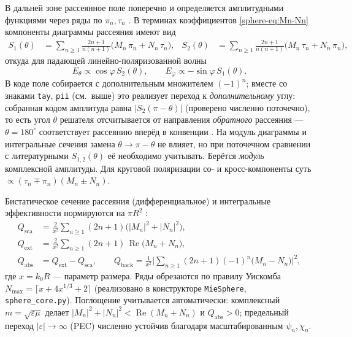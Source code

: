 \documentclass[11pt,a4paper]{article}
\begin{document}
В дальней зоне рассеянное поле поперечно и определяется амплитудными функциями через ряды по $\pi_n,\tau_n$ \cite{bohren1983}. В терминах коэффициентов \eqref{sphere-eq:Mn-Nn} компоненты диаграммы рассеяния имеют вид
\begin{align}
S_1(\theta)&=\sum_{n\ge1}\frac{2n+1}{n(n+1)}\big(M_n\,\pi_n+N_n\,\tau_n\big),
&
S_2(\theta)&=\sum_{n\ge1}\frac{2n+1}{n(n+1)}\big(M_n\,\tau_n+N_n\,\pi_n\big),
\label{sphere-eq:S12}
\end{align}
откуда для падающей линейно-поляризованной волны
\begin{equation}
E_\theta\propto \cos\varphi\,S_2(\theta),\qquad
E_\varphi\propto -\sin\varphi\,S_1(\theta).
\end{equation}
В коде поле собирается с дополнительным множителем $(-1)^n$; вместе со знаками \texttt{tay}, \texttt{pii} (см.\ выше) это реализует переход к \emph{дополнительному} углу: собранная кодом амплитуда равна $|S_2(\pi-\theta)|$ (проверено численно поточечно), то есть угол $\theta$ решателя отсчитывается от направления \emph{обратного} рассеяния --- $\theta=180^\circ$ соответствует рассеянию вперёд в конвенции \cite{bohren1983}. На модуль диаграммы и интегральные сечения замена $\theta\to\pi-\theta$ не влияет, но при поточечном сравнении с литературными $S_{1,2}(\theta)$ её необходимо учитывать. Берётся \emph{модуль} комплексной амплитуды. Для круговой поляризации со- и кросс-компоненты суть $\propto(\tau_n\mp\pi_n)(M_n\pm N_n)$.

Бистатическое сечение рассеяния (дифференциальное) и интегральные эффективности нормируются на $\pi R^2$ \cite{bohren1983,mishchenko2002}:
\begin{align}
Q_{\text{sca}} &= \frac{2}{x^2}\sum_{n\ge1}(2n+1)\big(|M_n|^2+|N_n|^2\big),\\
Q_{\text{ext}} &= \frac{2}{x^2}\sum_{n\ge1}(2n+1)\,\operatorname{Re}\!\big(M_n+N_n\big),\\
Q_{\text{abs}} &= Q_{\text{ext}}-Q_{\text{sca}},\qquad
Q_{\text{back}} = \frac{1}{x^2}\Big|\sum_{n\ge1}(2n+1)(-1)^n\big(M_n-N_n\big)\Big|^2,
\label{sphere-eq:cross}
\end{align}
где $x=k_0R$ --- параметр размера. Ряды обрезаются по правилу Уискомба $N_{\max}=\lceil x+4x^{1/3}+2\rceil$ \cite{bohren1983,mishchenko2002} (реализовано в конструкторе \texttt{MieSphere}, \texttt{sphere\_core.py}). Поглощение учитывается автоматически: комплексный $m=\sqrt{\varepsilon\mu}$ делает $|M_n|^2+|N_n|^2<\operatorname{Re}(M_n+N_n)$ и $Q_{\text{abs}}>0$; предельный переход $|\varepsilon|\to\infty$ (PEC) численно устойчив благодаря масштабированным $\psi_n,\chi_n$.
\end{document}
